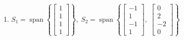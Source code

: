 \begin{question}
\begin{enumerate}[label=\alph*)]
    \item $S_1 = \operatorname{span}\left\{\begin{bmatrix}
              1 \\ 1 \\ 1 \\1
            \end{bmatrix}\right\}, \;
            S_2 = \operatorname{span}\left\{
            \begin{bmatrix}
              -1 \\ 1 \\ -1 \\ 1
            \end{bmatrix}, \;
            \begin{bmatrix}
              0 \\ 2 \\ -2 \\ 0
            \end{bmatrix}
            \right\}$
  \end{enumerate}
\end{question}

